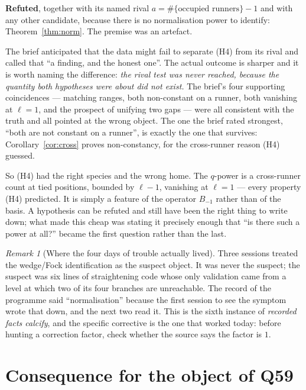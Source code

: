 \documentclass[11pt]{article}
\theoremstyle{definition}
\theoremstyle{remark}
\newtheorem{remark}[theorem]{Remark}
\begin{document}
\noindent \textbf{Refuted}, together with its named rival $a=\#\{\text{occupied
runners}\}-1$ and with any other candidate, because there is no normalisation power to
identify: Theorem~\ref{thm:norm}. The premise was an artefact.

The brief anticipated that the data might fail to separate (H4) from its rival and called
that ``a finding, and the honest one''. The actual outcome is sharper and it is worth
naming the difference: \emph{the rival test was never reached, because the quantity both
hypotheses were about did not exist.} The brief's four supporting coincidences --- matching
ranges, both non-constant on a runner, both vanishing at $\ell=1$, and the prospect of
unifying two gaps --- were all consistent with the truth and all pointed at the wrong
object. The one the brief rated strongest, ``both are not constant on a runner'', is
exactly the one that survives: Corollary~\ref{cor:cross} proves non-constancy, for the
cross-runner reason (H4) guessed.

So (H4) had the right species and the wrong home. The $q$-power is a cross-runner count
at tied positions, bounded by $\ell-1$, vanishing at $\ell=1$ --- every property (H4)
predicted. It is simply a feature of the operator $B_{-1}$ rather than of the basis. A
hypothesis can be refuted and still have been the right thing to write down; what made
this cheap was stating it precisely enough that ``is there such a power at all?'' became
the first question rather than the last.

\begin{remark}[Where the four days of trouble actually lived]
Three sessions treated the wedge/Fock identification as the suspect object. It was never
the suspect; the suspect was six lines of straightening code whose only validation came
from a level at which two of its four branches are unreachable. The record of the
programme said ``normalisation'' because the first session to see the symptom wrote that
down, and the next two read it. This is the sixth instance of
\emph{recorded facts calcify}, and the specific corrective is the one that worked today:
before hunting a correction factor, check whether the source says the factor is $1$.
\end{remark}

\section{Consequence for the object of Q59}\label{sec:consequence}
\end{document}
